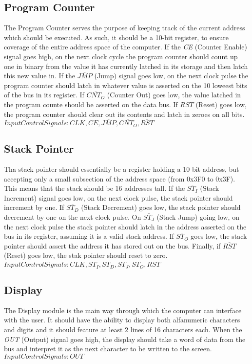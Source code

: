 \subsection{Program Counter} \label{pc}
The Program Counter serves the purpose of keeping track of the current address which should be executed. As such, it should
be a 10-bit register, to ensure coverage of the entire address space of the computer. If the \emph{CE} (Counter Enable) signal
goes high, on the next clock cycle the program counter should count up one in binary from the value it has currently latched
in its storage and then latch this new value in. If the \emph{$\overline{JMP}$} (Jump) signal goes low, on the next clock pulse the
program counter should latch in whatever value is asserted on the 10 loweest bits of the bus in its register. If
\emph{$\overline{CNT_O}$} (Counter Out) goes low, the value latched in the program counte should be asserted on the data bus.
If \emph{$\overline{RST}$} (Reset) goes low, the program counter should clear out its contents and latch in zeroes on all bits. \\
\textbf{$Input Control Signals: CLK, CE, \overline{JMP}, \overline{CNT_O}, \overline{RST}$}

\subsection{Stack Pointer} \label{stack-pointer}
Tha stack pointer should essentially be a register holding a 10-bit address, but accepting only a small subsection of the address
space (from 0x3F0 to 0x3F). This means that the stack should be 16 addresses tall. If the \emph{$\overline{ST_I}$} (Stack Increment)
signal goes low, on the next clock pulse, the stack pointer should increment by one. If \emph{$\overline{ST_D}$} (Stack Decrement)
goes low, the stack pointer should decrement by one on the next clock pulse.
On \emph{$\overline{ST_J}$} (Stack Jump) going low, on the next clock pulse the stack pointer should latch in the address asserted
on the bus in its register, assuming it is a valid stack address. If \emph{$\overline{ST_O}$} goes low, the stack pointer should
assert the address it has stored out on the bus. Finally, if \emph{$\overline{RST}$} (Reset) goes low, the stak pointer should reset
to zero. \\
\textbf{$Input Control Signals: CLK, \overline{ST_I}, \overline{ST_D}, \overline{ST_J}, \overline{ST_O}, \overline{RST}$}

\subsection{Display} \label{display}
The Display module is the main way through which the computer can interface with the user. It should have the ability to display
both alfanumeric characters and digits and it should feature at least 2 lines of 16 characters each. When the \emph{OUT} (Output)
signal goes high, the display should take a word of data from the bus and interpret it as the next character to be written to the
screen. \\
\textbf{$Input Control Signals: OUT$}

